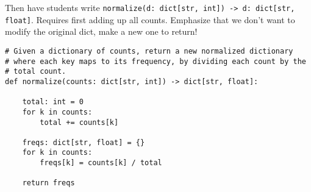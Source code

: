 \documentclass{article}
\begin{document}
Then have students write
\verb|normalize(d: dict[str, int]) -> d: dict[str, float]|.  Requires
first adding up all counts.  Emphasize that we don't want to modify
the original dict, make a new one to return!

\begin{verbatim}
# Given a dictionary of counts, return a new normalized dictionary
# where each key maps to its frequency, by dividing each count by the
# total count.
def normalize(counts: dict[str, int]) -> dict[str, float]:

    total: int = 0
    for k in counts:
        total += counts[k]

    freqs: dict[str, float] = {}
    for k in counts:
        freqs[k] = counts[k] / total

    return freqs
\end{verbatim}
\end{document}
